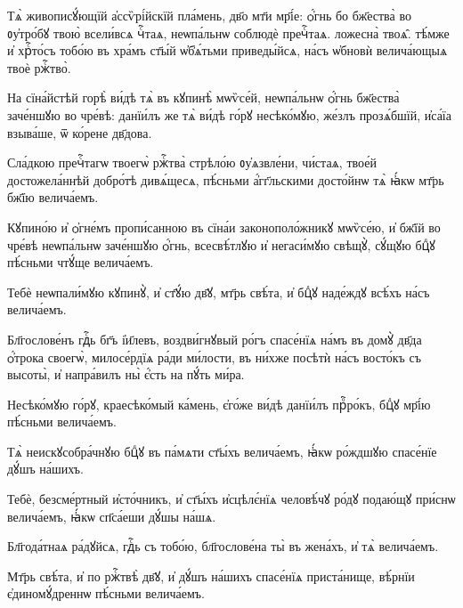 \hKv Тѧ̀ живописꙋ́ющїй а҆ссѷрі́йскїй пла́мень, дв҃о мт҃и мр҃і́е:  ѻ҆́гнь бо бж҃ества̀ во ᲂу҆тро́бꙋ твою̀ всели́всѧ чⷭ҇таѧ,  неѡпа́льнѡ соблюдѐ пречⷭ҇таѧ. ложесна̀ твоѧ̑. тѣ́мже и҆  хрⷭ҇то́съ тобо́ю въ хра́мъ ст҃ы́й ѡ҆б̾ѧ́тьми приведы́йсѧ,  на́съ ѡ҆бновѝ велича́ющыѧ твоѐ ржⷭ҇тво̀.  
%

\hKv На сїна́йстѣй горѣ̀ ви́дѣ тѧ̀ въ кꙋпинѣ̀ мѡѷсе́й,  неѡпа́льнѡ ѻ҆́гнь бж҃ества̀ заче́ншꙋю во чре́вѣ: данїи́лъ  же тѧ̀ ви́дѣ го́рꙋ несѣко́мꙋю, же́злъ прозѧ́бшїй, и҆са́їа  взыва́ше, ѿ ко́рене дв҃дова. 

\hKv Сла́дкою пречⷭ҇тагѡ твоегѡ̀ ржⷭ҇тва̀ стрѣло́ю ᲂу҆ѧзвле́ни,  чи́стаѧ, твое́й достожела́ннѣй добро́тѣ дивѧ́щесѧ,  пѣ́сньми а҆́гг҃льскими досто́йнѡ тѧ̀ ꙗ҆́кѡ мт҃рь бж҃їю  велича́емъ. 

\hKv Кꙋпино́ю и҆ ѻ҆гне́мъ пропи́санною въ сїна́и  законополо́жникꙋ мѡѷсе́ю, и҆ бж҃їй во чре́вѣ  неѡпа́льнѡ заче́ншꙋю ѻ҆́гнь,  всесвѣ́тлꙋю и҆ негаси́мꙋю свѣщꙋ̀, сꙋ́щꙋю бцⷣꙋ пѣ́сньми  чтꙋ́ще велича́емъ. 

\hKv Тебѐ неѡпали́мꙋю кꙋпинꙋ̀, и҆ ст҃ꙋ́ю дв҃ꙋ, мт҃рь свѣ́та, и҆  бцⷣꙋ наде́ждꙋ всѣ́хъ на́съ велича́емъ. 

\hKv Бл҃гослове́нъ гдⷭ҇ь бг҃ъ і҆и҃левъ, воздви́гнꙋвый ро́гъ  спасе́нїѧ на́мъ въ домꙋ̀ дв҃да ѻ҆́трока своегѡ̀,  милосе́рдїѧ ра́ди ми́лости, въ ни́хже посѣтѝ на́съ  восто́къ съ высоты̀, и҆ напра́вилъ ны̀ є҆́сть на пꙋ́ть  ми́ра. 

\hKv Несѣко́мꙋю го́рꙋ, краесѣко́мый ка́мень, є҆го́же ви́дѣ  данїи́лъ прⷪ҇ро́къ, бцⷣꙋ мр҃і́ю пѣ́сньми велича́емъ. 

\hKv Тѧ̀ неискꙋсобра́чнꙋю бцⷣꙋ въ па́мѧти ст҃ы́хъ велича́емъ,  ꙗ҆́кѡ ро́ждшꙋю спасе́нїе дꙋ́шъ на́шихъ. 

\hKv Тебѐ, безсме́ртный и҆сто́чникъ, и҆ ст҃ы́хъ и҆сцѣлє́нїѧ  человѣ́чꙋ ро́дꙋ подаю́щꙋ при́снѡ велича́емъ, ꙗ҆́кѡ  сп҃са́еши дꙋ́шы на́шѧ.  

\hKv Бл҃года́тнаѧ ра́дꙋйсѧ, гдⷭ҇ь съ тобо́ю, бл҃гослове́на ты̀ въ  жена́хъ, и҆ тѧ̀ велича́емъ. 

\hKv Мт҃рь свѣ́та, и҆ по ржⷭ҇твѣ̀ дв҃ꙋ, и҆ дꙋ́шъ на́шихъ  спасе́нїѧ приста́нище, вѣ́рнїи є҆диномꙋ́дреннѡ пѣ́сньми  велича́емъ.  


